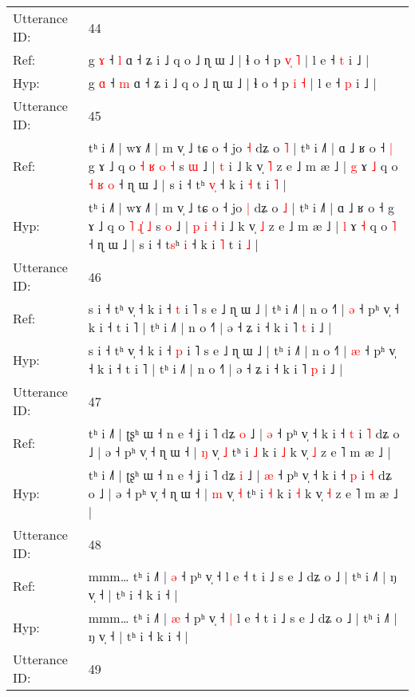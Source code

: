 \documentclass[10pt]{article}
\DeclareRobustCommand{\hl}[1]{{\textcolor{red}{#1}}}
\begin{document}
\begin{longtable}{ll}
 \\
\midrule
Utterance ID: & 44 \\
Ref: & g \hl{ɤ} ˧ \hl{l} ɑ ˧ ʑ i ˩ q o ˩ ɳ ɯ ˩ | ɬ o ˧ p \hl{v}\hl{̩} \hl{˥} | l e ˧ \hl{t} i ˩ |
 \\
Hyp: & g \hl{ɑ} ˧ \hl{m} ɑ ˧ ʑ i ˩ q o ˩ ɳ ɯ ˩ | ɬ o ˧ p \hl{}\hl{i} \hl{˧} | l e ˧ \hl{p} i ˩ |
 \\
\midrule
Utterance ID: & 45 \\
Ref: & tʰ i ˩˥ | wɤ ˩˥ | m v̩ ˩ tɕ o ˧ jo \hl{˧} dʑ o \hl{˥} | tʰ i ˩˥ | ɑ ˩ ʁ o ˧\hl{ }\hl{|} g ɤ ˩ q o \hl{˧} \hl{ʁ}\hl{ }\hl{o} \hl{˧} s \hl{ɯ} ˩ |\hl{}\hl{}\hl{}\hl{} \hl{t} i ˩ k v̩ \hl{˥} z e ˩ m æ ˩ | \hl{g} ɤ \hl{˩} q o\hl{ }\hl{˧}\hl{ }\hl{ʁ} \hl{o} ˧ ɳ ɯ ˩ | s i ˧ t\hl{}ʰ \hl{v}\hl{̩} ˧ k i \hl{˧} t i \hl{˥} |
 \\
Hyp: & tʰ i ˩˥ | wɤ ˩˥ | m v̩ ˩ tɕ o ˧ jo \hl{|} dʑ o \hl{˩} | tʰ i ˩˥ | ɑ ˩ ʁ o ˧\hl{}\hl{} g ɤ ˩ q o \hl{˥} \hl{}\hl{ɻ}\hl{̍} \hl{˩} s \hl{o} ˩ |\hl{ }\hl{p}\hl{ }\hl{i} \hl{˧} i ˩ k v̩ \hl{˩} z e ˩ m æ ˩ | \hl{l} ɤ \hl{˧} q o\hl{}\hl{}\hl{}\hl{} \hl{˥} ˧ ɳ ɯ ˩ | s i ˧ t\hl{s}ʰ \hl{}\hl{i} ˧ k i \hl{˥} t i \hl{˩} |
 \\
\midrule
Utterance ID: & 46 \\
Ref: & s i ˧ tʰ v̩ ˧ k i ˧ \hl{t} i ˥ s e ˩ ɳ ɯ ˩ | tʰ i ˩˥ | n o ˧˥ | \hl{ə} ˧ pʰ v̩ ˧ k i ˧ t i ˥ | tʰ i ˩˥ | n o ˧˥ | ə ˧ ʑ i ˧ k i ˥ \hl{t} i ˩ |
 \\
Hyp: & s i ˧ tʰ v̩ ˧ k i ˧ \hl{p} i ˥ s e ˩ ɳ ɯ ˩ | tʰ i ˩˥ | n o ˧˥ | \hl{æ} ˧ pʰ v̩ ˧ k i ˧ t i ˥ | tʰ i ˩˥ | n o ˧˥ | ə ˧ ʑ i ˧ k i ˥ \hl{p} i ˩ |
 \\
\midrule
Utterance ID: & 47 \\
Ref: & tʰ i ˩˥ | ʈʂʰ ɯ ˧ n e ˧ ʝ i ˥ dʑ \hl{o} ˩ | \hl{ə} ˧ pʰ v̩ ˧ k i ˧ \hl{t} i \hl{˥} dʑ o ˩ | ə ˧ pʰ v̩ ˧ ɳ ɯ ˧ | \hl{ŋ} v̩ \hl{˩} tʰ i \hl{˩} k i \hl{˩} k v̩ \hl{˩} z e ˥ m æ ˩ |
 \\
Hyp: & tʰ i ˩˥ | ʈʂʰ ɯ ˧ n e ˧ ʝ i ˥ dʑ \hl{i} ˩ | \hl{æ} ˧ pʰ v̩ ˧ k i ˧ \hl{p} i \hl{˧} dʑ o ˩ | ə ˧ pʰ v̩ ˧ ɳ ɯ ˧ | \hl{m} v̩ \hl{˧} tʰ i \hl{˧} k i \hl{˧} k v̩ \hl{˧} z e ˥ m æ ˩ |
 \\
\midrule
Utterance ID: & 48 \\
Ref: & mmm… tʰ i ˩˥ | \hl{ə} ˧ pʰ v̩ ˧\hl{}\hl{} l e ˧ t i ˩ s e ˩ dʑ o ˩ | tʰ i ˩˥ | ŋ v̩ ˧ | tʰ i ˧ k i ˧ |
 \\
Hyp: & mmm… tʰ i ˩˥ | \hl{æ} ˧ pʰ v̩ ˧\hl{ }\hl{|} l e ˧ t i ˩ s e ˩ dʑ o ˩ | tʰ i ˩˥ | ŋ v̩ ˧ | tʰ i ˧ k i ˧ |
 \\
\midrule
Utterance ID: & 49 \\

\end{longtable}
\end{document}
